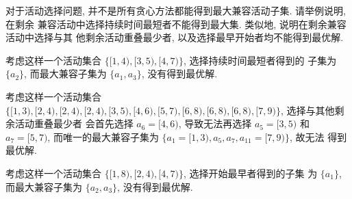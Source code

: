 \documentclass[boxes]{homework}
\begin{document}
\begin{problem}
对于活动选择问题, 并不是所有贪心方法都能得到最大兼容活动子集. 请举例说明, 在剩余
兼容活动中选择持续时间最短者不能得到最大集. 类似地, 说明在剩余兼容活动中选择与其
他剩余活动重叠最少者, 以及选择最早开始者均不能得到最优解.
\end{problem}
\begin{solution}
    考虑这样一个活动集合 $\{[1, 4), [3, 5), [4, 7)\}$, 选择持续时间最短者得到的
    子集为 $\{a_2\}$, 而最大兼容子集为 $\{a_1, a_3\}$, 没有得到最优解.

    考虑这样一个活动集合 $\{[1, 3), [2, 4), [2, 4), [2, 4), [3, 5), [4, 6),
        [5, 7), [6, 8), [6, 8), [6, 8), [7, 9)\}$, 选择与其他剩余活动重叠最少者
    会首先选择 $a_6 = [4, 6)$, 导致无法再选择 $a_5 = [3, 5)$ 和 $a_7 = [5, 7)$,
    而唯一的最大兼容子集为 $\{a_1 = [1, 3), a_5, a_7, a_{11} = [7, 9)\}$, 故无法
    得到最优解.

    考虑这样一个活动集合 $\{[1, 8), [2, 4), [4, 7)\}$, 选择开始最早者得到的子集
    为 $\{a_1\}$, 而最大兼容子集为 $\{a_2, a_3\}$, 没有得到最优解.
\end{solution}
\end{document}
